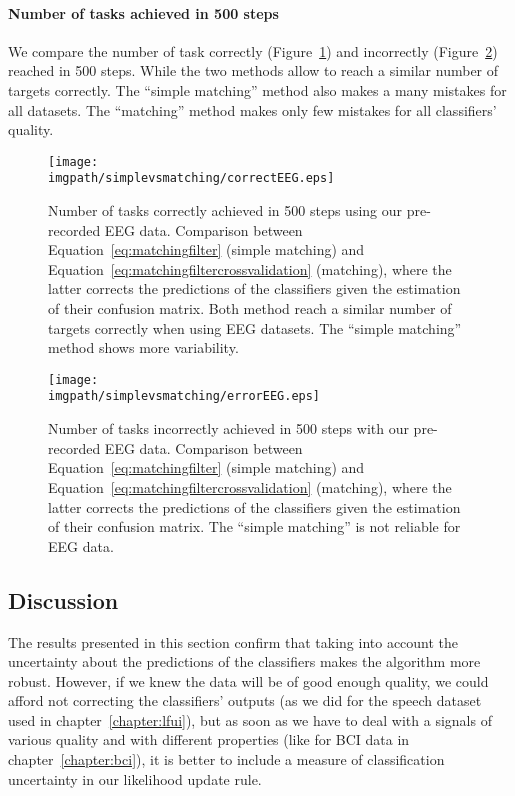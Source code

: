 \paragraph{Number of tasks achieved in 500 steps}

We compare the number of task correctly (Figure~\ref{fig:nCorrect_simplevsmatchingEEG}) and incorrectly (Figure~\ref{fig:nWrongEEG_simplevsmatchingEEG}) reached in 500 steps. While the two methods allow to reach a similar number of targets correctly. The ``simple matching'' method also makes a many mistakes for all datasets. The ``matching'' method makes only few mistakes for all classifiers' quality.

\begin{figure}[!htbp]
\centering
\texttt{[image: \\imgpath/simplevsmatching/correctEEG.eps]}
\caption{Number of tasks correctly achieved in 500 steps using our pre-recorded EEG data. Comparison between Equation~\ref{eq:matchingfilter} (simple matching) and Equation~\ref{eq:matchingfiltercrossvalidation} (matching), where the latter corrects the predictions of the classifiers given the estimation of their confusion matrix. Both method reach a similar number of targets correctly when using EEG datasets. The ``simple matching''  method shows more variability.}
\label{fig:nCorrect_simplevsmatchingEEG}
\end{figure} 

\begin{figure}[!htbp]
\centering
\texttt{[image: \\imgpath/simplevsmatching/errorEEG.eps]}
\caption{Number of tasks incorrectly achieved in 500 steps with our pre-recorded EEG data. Comparison between Equation~\ref{eq:matchingfilter} (simple matching) and Equation~\ref{eq:matchingfiltercrossvalidation} (matching), where the latter corrects the predictions of the classifiers given the estimation of their confusion matrix. The ``simple matching'' is not reliable for EEG data.}
\label{fig:nWrongEEG_simplevsmatchingEEG}
\end{figure} 

\subsection{Discussion}

The results presented in this section confirm that taking into account the uncertainty about the predictions of the classifiers makes the algorithm more robust. However, if we knew the data will be of good enough quality, we could afford not correcting the classifiers' outputs (as we did for the speech dataset used in chapter~\ref{chapter:lfui}), but as soon as we have to deal with a signals of various quality and with different properties (like for BCI data in chapter~\ref{chapter:bci}), it is better to include a measure of classification uncertainty in our likelihood update rule.